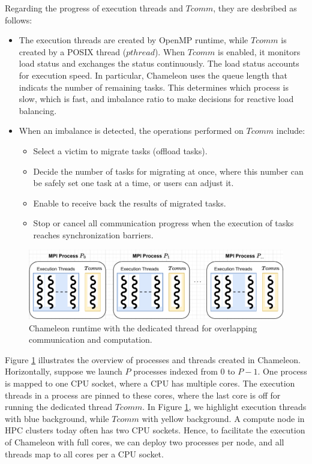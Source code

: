 Regarding the progress of execution threads and $Tcomm$, they are desbribed as follows:
\begin{itemize}
	\item The execution threads are created by OpenMP runtime, while $Tcomm$ is created by a POSIX thread ($pthread$). When $Tcomm$ is enabled, it monitors load status and exchanges the status continuously. The load status accounts for execution speed. In particular, Chameleon uses the queue length that indicats the number of remaining tasks. This determines which process is slow, which is fast, and imbalance ratio to make decisions for reactive load balancing.
	\item When an imbalance is detected, the operations performed on $Tcomm$ include:
		\begin{itemize}
			\item Select a victim to migrate tasks (offload tasks).
			\item Decide the number of tasks for migrating at once, where this number can be safely set one task at a time, or users can adjust it.
			\item Enable to receive back the results of migrated tasks.
			\item Stop or cancel all communication progress when the execution of tasks reaches synchronization barriers.
		\end{itemize}
\end{itemize}

\begin{figure}[t]
	\centering
	\includegraphics[scale=0.7]{./pictures/poc_implementation/poc_chameleon_and_commthread.pdf}
	\caption{Chameleon runtime with the dedicated thread for overlapping communication and computation.}
	\label{fig:poc_chameleon_commthread}
\end{figure}

Figure \ref{fig:poc_chameleon_commthread} illustrates the overview of processes and threads created in Chameleon. Horizontally, suppose we launch $P$ processes indexed from $0$ to $P-1$. One process is mapped to one CPU socket, where a CPU has multiple cores. The execution threads in a process are pinned to these cores, where the last core is off for running the dedicated thread $Tcomm$. In Figure \ref{fig:poc_chameleon_commthread}, we highlight execution threads with blue background, while $Tcomm$ with yellow background. A compute node in HPC clusters today often has two CPU sockets. Hence, to facilitate the execution of Chameleon with full cores, we can deploy two processes per node, and all threads map to all cores per a CPU socket.\\

